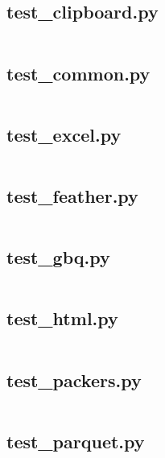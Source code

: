 \documentclass{article}
\begin{document}
\subsection{test\_clipboard.py}
\inputminted{python}{/home/dufferzafar/dev/@clones/pandas/pandas/tests/io/test_clipboard.py}
\newpage

\subsection{test\_common.py}
\inputminted{python}{/home/dufferzafar/dev/@clones/pandas/pandas/tests/io/test_common.py}
\newpage

\subsection{test\_excel.py}
\inputminted{python}{/home/dufferzafar/dev/@clones/pandas/pandas/tests/io/test_excel.py}
\newpage

\subsection{test\_feather.py}
\inputminted{python}{/home/dufferzafar/dev/@clones/pandas/pandas/tests/io/test_feather.py}
\newpage

\subsection{test\_gbq.py}
\inputminted{python}{/home/dufferzafar/dev/@clones/pandas/pandas/tests/io/test_gbq.py}
\newpage

\subsection{test\_html.py}
\inputminted{python}{/home/dufferzafar/dev/@clones/pandas/pandas/tests/io/test_html.py}
\newpage

\subsection{test\_packers.py}
\inputminted{python}{/home/dufferzafar/dev/@clones/pandas/pandas/tests/io/test_packers.py}
\newpage

\subsection{test\_parquet.py}
\inputminted{python}{/home/dufferzafar/dev/@clones/pandas/pandas/tests/io/test_parquet.py}
\newpage
\end{document}
